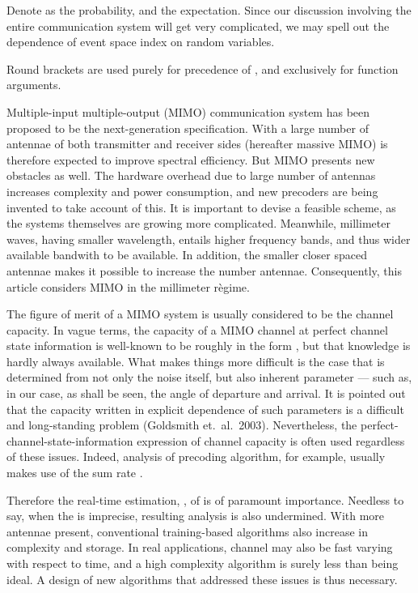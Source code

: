 Denote as  the probability, and  the expectation.
Since our discussion involving the entire communication system will get very complicated, we may spell out the dependence of event space index on random variables.

Round brackets \m {\RB {\cdot}} are used purely for precedence of , and \m {\SB {\cdot}} exclusively for function arguments.

\stopsection
\startsection [title={Background}]

Multiple-input multiple-output (MIMO) communication system has been proposed to be the next-generation specification.
With a large number of antennae of both transmitter and receiver sides (hereafter massive MIMO) is therefore expected to improve spectral efficiency.
But MIMO presents new obstacles as well.
The hardware overhead due to large number of antennas increases complexity and power consumption, and new precoders are being invented to take account of this.
It is important to devise a feasible scheme, as the systems themselves are growing more complicated.
Meanwhile, millimeter waves, having smaller wavelength, entails higher frequency bands, and thus wider available bandwith to be available.
In addition, the smaller closer spaced antennae makes it possible to increase the number antennae.
Consequently, this article considers MIMO in the millimeter r\`egime.

The figure of merit of a MIMO system is usually considered to be the channel capacity.
In vague terms, the capacity  of a MIMO channel  at perfect channel state information is well-known to be roughly in the form , but that knowledge is hardly always available.
What makes things more difficult is the case that  is determined from not only the noise itself, but also inherent parameter --- such as, in our case, as shall be seen, the angle of departure and arrival.
It is pointed out that the capacity written in explicit dependence of such parameters is a difficult and long-standing problem (Goldsmith et.\ al.\ 2003).
Nevertheless, the perfect-channel-state-information expression of channel capacity is often used regardless of these issues.
Indeed, analysis of precoding algorithm, for example, usually makes use of the sum rate .

Therefore the real-time estimation, , of  is of paramount importance.
Needless to say, when the  is imprecise, resulting analysis is also undermined.
With more antennae present, conventional training-based algorithms also increase in complexity and storage.
In real applications, channel may also be fast varying with respect to time, and a high complexity algorithm is surely less than being ideal.
A design of new algorithms that addressed these issues is thus necessary.

